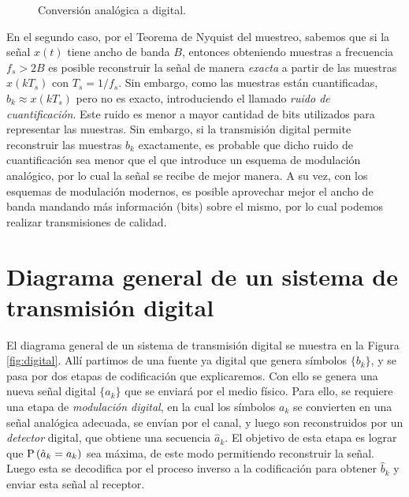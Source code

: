 \begin{figure}
    \begin{center}        
        \caption{Conversión analógica a digital.}\label{fig:a/d}
    \end{center}
\end{figure}

En el segundo caso, por el Teorema de Nyquist del muestreo, sabemos que si la señal $x(t)$ tiene ancho de banda $B$, entonces obteniendo muestras a frecuencia $f_s>2B$ es posible reconstruir la señal de manera \emph{exacta} a partir de las muestras $x(kT_s)$ con $T_s=1/f_s$. Sin embargo, como las muestras están cuantificadas, $b_k\approx x(kT_s)$ pero no es exacto, introduciendo el llamado \emph{ruido de cuantificación}. Este ruido es menor a mayor cantidad de bits utilizados para representar las muestras. Sin embargo, si la transmisión digital permite reconstruir las muestras $b_k$ exactamente, es probable que dicho ruido de cuantificación sea menor que el que introduce un esquema de modulación analógico, por lo cual la señal se recibe de mejor manera. A su vez, con los esquemas de modulación modernos, es posible aprovechar mejor el ancho de banda mandando más información (bits) sobre el mismo, por lo cual podemos realizar transmisiones de calidad.

\section{Diagrama general de un sistema de transmisión digital}

El diagrama general de un sistema de transmisión digital se muestra en la Figura \ref{fig:digital}. Allí partimos de una fuente ya digital que genera símbolos $\{b_k\}$, y se pasa por dos etapas de codificación que explicaremos. Con ello se genera una nueva señal digital $\{a_k\}$ que se enviará por el medio físico. Para ello, se requiere una etapa de \emph{modulación digital}, en la cual los símbolos $a_k$ se convierten en una señal analógica adecuada, se envían por el canal, y luego son reconstruidos por un \emph{detector} digital, que obtiene una secuencia $\hat{a}_k$. El objetivo de esta etapa es lograr que $\mathrm{P}\left(\hat{a}_k=a_k\right)$ sea máxima, de este modo permitiendo reconstruir la señal. Luego esta se decodifica por el proceso inverso a la codificación para obtener $\hat{b}_k$ y enviar esta señal al receptor. 

